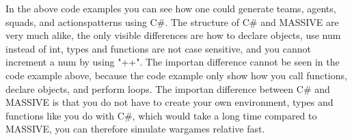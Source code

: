 In the above code examples you can see how one could generate teams, agents, squads, and actionspatterns using C\#. The structure of C\# and MASSIVE are very much alike, the only visible differences are how to declare objects, use num instead of int, types and functions are not case sensitive, and you cannot increment a num by using "++". The importan difference cannot be seen in the code example above, because the code example only show how you call functions, declare objects, and perform loops. The importan difference between C\# and MASSIVE is that you do not have to create your own environment, types and functions like you do with C\#, which would take a long time compared to MASSIVE, you can therefore simulate wargames relative fast.

